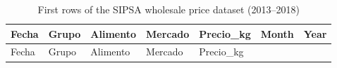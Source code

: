 \documentclass[
  12pt,
]{article}
\begin{document}
\begin{longtable}[]{@{}
  >{\raggedright\arraybackslash}p{}
  >{\raggedright\arraybackslash}p{}
  >{\raggedright\arraybackslash}p{}
  >{\raggedright\arraybackslash}p{}
  >{\raggedleft\arraybackslash}p{}
  >{\raggedleft\arraybackslash}p{}
  >{\raggedleft\arraybackslash}p{}@{}}
\caption{First rows of the SIPSA wholesale price dataset
(2013--2018)}\tabularnewline
\toprule\noalign{}
\begin{minipage}[b]{\linewidth}\raggedright
Fecha
\end{minipage} & \begin{minipage}[b]{\linewidth}\raggedright
Grupo
\end{minipage} & \begin{minipage}[b]{\linewidth}\raggedright
Alimento
\end{minipage} & \begin{minipage}[b]{\linewidth}\raggedright
Mercado
\end{minipage} & \begin{minipage}[b]{\linewidth}\raggedleft
Precio\_kg
\end{minipage} & \begin{minipage}[b]{\linewidth}\raggedleft
Month
\end{minipage} & \begin{minipage}[b]{\linewidth}\raggedleft
Year
\end{minipage} \\
\midrule\noalign{}
\endfirsthead
\toprule\noalign{}
\begin{minipage}[b]{\linewidth}\raggedright
Fecha
\end{minipage} & \begin{minipage}[b]{\linewidth}\raggedright
Grupo
\end{minipage} & \begin{minipage}[b]{\linewidth}\raggedright
Alimento
\end{minipage} & \begin{minipage}[b]{\linewidth}\raggedright
Mercado
\end{minipage} & \begin{minipage}[b]{\linewidth}\raggedleft
Precio\_kg
\end{minipage} & \begin{minipage}[b]{\linewidth}\raggedleft

\end{minipage}
\end{longtable}
\end{document}
